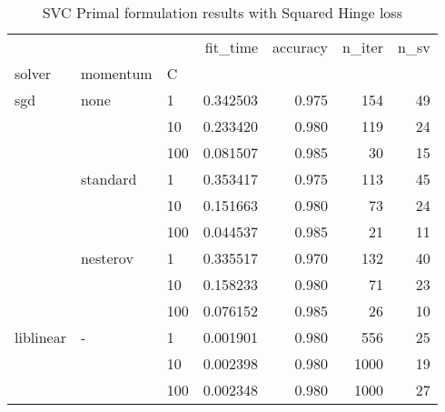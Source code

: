 \begin{table}[H]
\centering
\caption{SVC Primal formulation results with Squared Hinge loss}
\label{primal_svc_squared_hinge_cv_results}
\begin{tabular}{lllrrrr}
\toprule
          &   &     &  fit\_time &  accuracy &  n\_iter &  n\_sv \\
solver & momentum & C &           &           &         &       \\
\midrule
sgd & none & 1   &  0.342503 &     0.975 &     154 &    49 \\
          &   & 10  &  0.233420 &     0.980 &     119 &    24 \\
          &   & 100 &  0.081507 &     0.985 &      30 &    15 \\
          & standard & 1   &  0.353417 &     0.975 &     113 &    45 \\
          &   & 10  &  0.151663 &     0.980 &      73 &    24 \\
          &   & 100 &  0.044537 &     0.985 &      21 &    11 \\
          & nesterov & 1   &  0.335517 &     0.970 &     132 &    40 \\
          &   & 10  &  0.158233 &     0.980 &      71 &    23 \\
          &   & 100 &  0.076152 &     0.985 &      26 &    10 \\
liblinear & - & 1   &  0.001901 &     0.980 &     556 &    25 \\
          &   & 10  &  0.002398 &     0.980 &    1000 &    19 \\
          &   & 100 &  0.002348 &     0.980 &    1000 &    27 \\
\bottomrule
\end{tabular}
\end{table}
